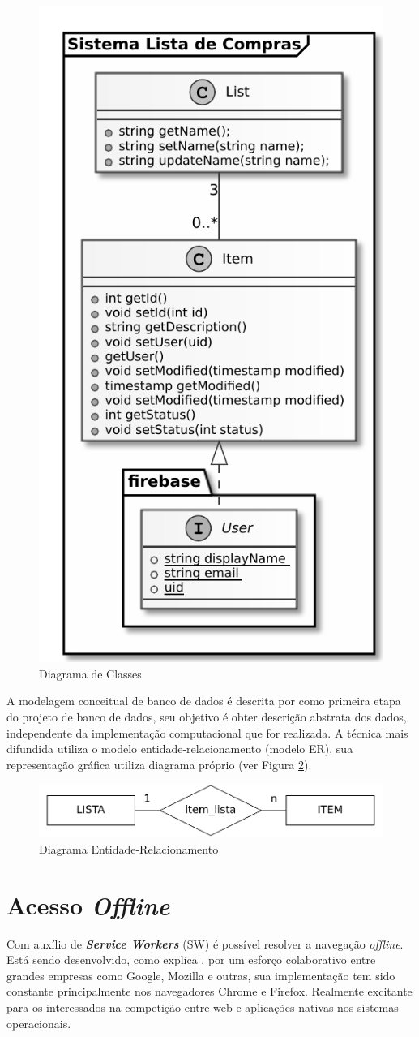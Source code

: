 \documentclass[12pt]{article}
\begin{document}
\begin{figure}[ht]
\centering
\includegraphics[width=.48\textwidth,keepaspectratio]{figures/classes.pdf}
\caption{Diagrama de Classes}
\label{fig:classes}
\end{figure}

A modelagem conceitual de banco de dados é descrita por \cite{heuser2009} como primeira etapa do projeto de banco de dados, seu objetivo é obter descrição abstrata dos dados, independente da implementação computacional que for realizada. A técnica mais difundida utiliza o modelo entidade-relacionamento (modelo ER), sua representação gráfica utiliza diagrama próprio (ver Figura \ref{fig:me}).

\begin{figure}[ht]
\centering
\includegraphics[width=.7\textwidth,keepaspectratio]{figures/mer.pdf}
\caption{Diagrama Entidade-Relacionamento}
\label{fig:me}
\end{figure}

\section{Acesso \textit{Offline}}

Com auxílio de \textbf{\textit{Service Workers}} (SW) é possível resolver a navegação \textit{offline}. Está sendo desenvolvido, como explica \cite{swfirstdraft}, por um esforço colaborativo entre grandes empresas como Google, Mozilla e outras, sua implementação tem sido constante principalmente nos navegadores Chrome e Firefox. Realmente excitante para os interessados na competição entre web e aplicações nativas nos sistemas operacionais.
\end{document}
